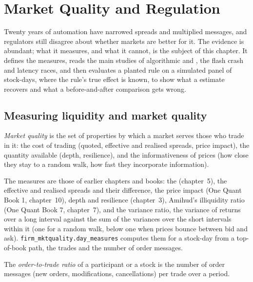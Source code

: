 \chapter{Market Quality and Regulation}\label{ch:mx:market-quality-and-regulation}

Twenty years of automation have narrowed spreads and multiplied messages, and regulators still disagree about whether markets are better for it.
The evidence is abundant; what it measures, and what it cannot, is the subject of this chapter. It defines the measures, reads the main studies of
algorithmic and , the flash crash and latency races, and then evaluates a planted rule on a simulated panel of stock-days, where
the rule's true effect is known, to show what a  estimate recovers and what a before-and-after comparison gets wrong.

\section{Measuring liquidity and market quality}

\begin{definition}\label{def:mx:market-quality-and-regulation:quality}
\emph{Market quality} is the set of properties by which a market serves those who trade in it: the cost of trading (quoted,
effective and realised spreads, price impact), the quantity available (depth, resilience), and the informativeness of prices (how close they stay to
a random walk, how fast they incorporate information).
\end{definition}

The measures are those of earlier chapters and books: the  (chapter~5), the effective and realised spreads and their difference, the
price impact (One Quant Book 1, chapter~10), depth and resilience (chapter~3), Amihud's illiquidity ratio (One Quant Book 7, chapter~7), and the variance
ratio, the variance of returns over a long interval against the sum of the variances over the short intervals within it (one for a random walk, below one
when prices bounce between bid and ask). \texttt{firm\_mktquality.day\_measures} computes them for a stock-day from a top-of-book path, the trades and
the number of order messages.

\begin{definition}\label{def:mx:market-quality-and-regulation:otr}
The \emph{order-to-trade ratio} of a participant or a stock is the number of order messages (new orders, modifications,
cancellations) per trade over a period.
\end{definition}


